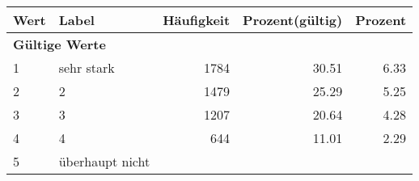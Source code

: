      \begin{longtable}{lXrrr}
     \toprule
     \textbf{Wert} & \textbf{Label} & \textbf{Häufigkeit} & \textbf{Prozent(gültig)} & \textbf{Prozent} \\
     \endhead
     \midrule
     \multicolumn{5}{l}{\textbf{Gültige Werte}}\\

     1 &
     \multicolumn{1}{X}{ sehr stark   } &


       \num{1784} &
       \num[round-mode=places,round-precision=2]{30,51} &
         \num[round-mode=places,round-precision=2]{6,33} \\

     2 &
     \multicolumn{1}{X}{ 2   } &


       \num{1479} &
       \num[round-mode=places,round-precision=2]{25,29} &
         \num[round-mode=places,round-precision=2]{5,25} \\

     3 &
     \multicolumn{1}{X}{ 3   } &


       \num{1207} &
       \num[round-mode=places,round-precision=2]{20,64} &
         \num[round-mode=places,round-precision=2]{4,28} \\

     4 &
     \multicolumn{1}{X}{ 4   } &


       \num{644} &
       \num[round-mode=places,round-precision=2]{11,01} &
         \num[round-mode=places,round-precision=2]{2,29} \\

     5 &
     \multicolumn{1}{X}{ überhaupt nicht   } &



\end{longtable}
